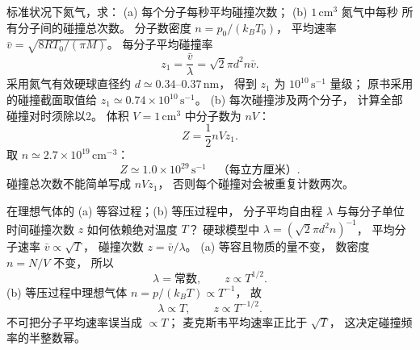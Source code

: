 标准状况下氮气，求：
(a) 每个分子每秒平均碰撞次数；
(b) $1\,\mathrm{cm^3}$ 氮气中每秒
所有分子间的碰撞总次数。
\exsolution
分子数密度
$n=p_0/(k_BT_0)$，
平均速率
$\bar v=\sqrt{8RT_0/(\pi M)}$。
每分子平均碰撞率
\[
\boxed{z_1=\frac{\bar v}{\lambda}
=\sqrt2\pi d^2 n\bar v}.
\]
采用氮气有效硬球直径约
$d\simeq0.34$--$0.37\,\mathrm{nm}$，
得到
$z_1$ 为
$10^{10}\,\mathrm{s^{-1}}$ 量级；
原书采用的碰撞截面取值给
$\boxed{z_1\simeq0.74\times10^{10}\,\mathrm{s^{-1}}}$。
(b) 每次碰撞涉及两个分子，
计算全部碰撞对时须除以2。
体积 $V=1\,\mathrm{cm^3}$ 中分子数为 $nV$：
\[
\boxed{Z=\frac12nVz_1}.
\]
取 $n\simeq2.7\times10^{19}\,\mathrm{cm^{-3}}$：
\[
\boxed{Z\simeq1.0\times10^{29}\,
\mathrm{s^{-1}}}
\quad\text{（每立方厘米）}.
\]
\excheck 碰撞总次数不能简单写成 $nVz_1$，
否则每个碰撞对会被重复计数两次。

在理想气体的
(a) 等容过程；(b) 等压过程中，
分子平均自由程 $\lambda$
与每分子单位时间碰撞次数 $z$
如何依赖绝对温度 $T$？
\exsolution
硬球模型中
$\lambda=(\sqrt2\pi d^2n)^{-1}$，
平均分子速率 $\bar v\propto\sqrt T$，
碰撞次数
$z=\bar v/\lambda$。
(a) 等容且物质的量不变，
数密度 $n=N/V$ 不变，
所以
\[
\boxed{\lambda=\text{常数},\qquad z\propto T^{1/2}}.
\]
(b) 等压过程中理想气体
$n=p/(k_BT)\propto T^{-1}$，
故
\[
\boxed{\lambda\propto T,\qquad z\propto T^{-1/2}}.
\]
\excheck 不可把分子平均速率误当成 $\propto T$；
麦克斯韦平均速率正比于 $\sqrt T$，
这决定碰撞频率的半整数幂。

